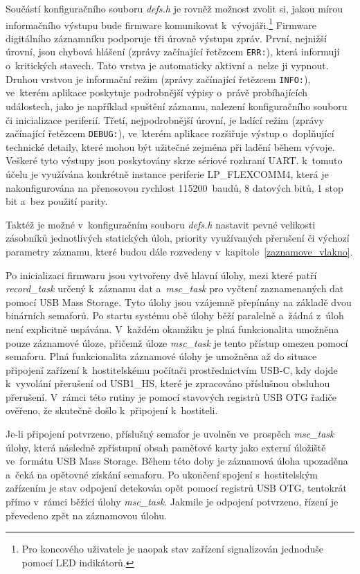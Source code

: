 Součástí konfiguračního souboru \textit{defs.h} je rovněž možnost zvolit si, jakou mírou informačního výstupu bude firmware komunikovat k~vývojáři.\footnote{Pro koncového uživatele je naopak stav zařízení signalizován jednoduše pomocí LED indikátorů.} Firmware digitálního záznamníku podporuje tři úrovně výstupu zpráv. První, nejnižší úrovní, jsou chybová hlášení (zprávy začínající řetězcem \texttt{ERR:}), která informují o~kritických stavech. Tato vrstva je automaticky aktivní a~nelze ji vypnout. Druhou vrstvou je informační režim (zprávy začínající řetězcem \texttt{INFO:}), ve~kterém aplikace poskytuje podrobnější výpisy o~právě probíhajících událostech, jako je například spuštění záznamu, nalezení konfiguračního souboru či inicializace periferií. Třetí, nejpodrobnější úrovní, je ladící režim (zprávy začínající řetězcem \texttt{DEBUG:}), ve~kterém aplikace rozšiřuje výstup o~doplňující technické detaily, které mohou být užitečné zejména při ladění během vývoje. Veškeré tyto výstupy jsou poskytovány skrze sériové rozhraní UART. k~tomuto účelu je využívána konkrétně instance periferie LP\_FLEXCOMM4, která je nakonfigurována na přenosovou rychlost 115200~baudů, 8 datových bitů, 1 stop bit a~bez použití parity.

Taktéž je možné v~konfiguračním souboru \textit{defs.h} nastavit pevné velikosti zásobníků jednotlivých statických úloh, priority využívaných přerušení či výchozí parametry záznamu, které budou dále rozvedeny v~kapitole~\ref{zaznamove_vlakno}. 

Po inicializaci firmwaru jsou vytvořeny dvě hlavní úlohy, mezi které patří \textit{record\_task} určený k~záznamu dat a~\textit{msc\_task} pro vyčtení zaznamenaných dat pomocí USB Mass Storage. Tyto úlohy jsou vzájemně přepínány na základě dvou binárních semaforů. Po startu systému obě úlohy běží paralelně a~žádná z~úloh není explicitně uspávána. V~každém okamžiku je plná funkcionalita umožněna pouze záznamové úloze, přičemž úloze \textit{msc\_task} je tento přístup omezen pomocí semaforu. Plná funkcionalita záznamové úlohy je umožněna až do situace připojení zařízení k~hostitelskému počítači prostřednictvím USB-C, kdy dojde k~vyvolání přerušení od USB1\_HS, které je zpracováno příslušnou obsluhou přerušení. V~rámci této rutiny je pomocí stavových registrů USB OTG řadiče ověřeno, že skutečně došlo k~připojení k~hostiteli. 

\newpage

Je-li připojení potvrzeno, příslušný semafor je uvolněn ve~prospěch \textit{msc\_task} úlohy, která následně zpřístupní obsah paměťové karty jako externí úložiště ve~formátu USB Mass Storage. Během této doby je záznamová úloha upozaděna a~čeká na opětovné získání semaforu. Po ukončení spojení s~hostitelským zařízením je stav odpojení detekován opět pomocí registrů USB OTG, tentokrát přímo v~rámci běžící úlohy \textit{msc\_task}. Jakmile je odpojení potvrzeno, řízení je převedeno zpět na záznamovou úlohu.

